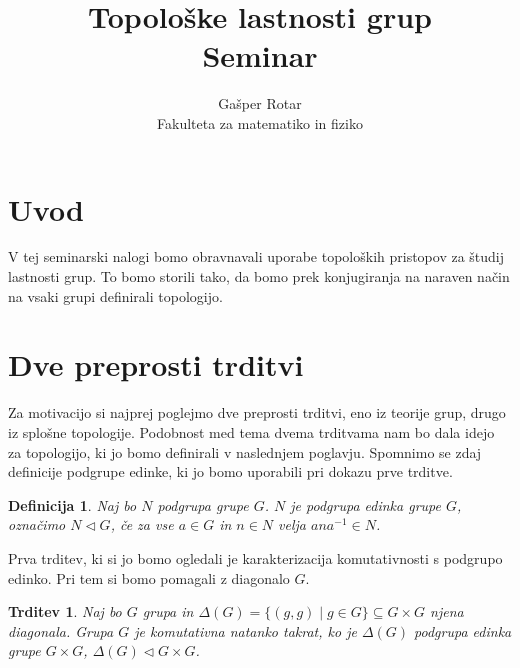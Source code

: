 \documentclass[a4paper,12pt]{article}
\title{Topološke lastnosti grup \\ 
\Large Seminar}
\author{Gašper Rotar \\
Fakulteta za matematiko in fiziko}
\newtheorem{trditev}{Trditev}
\newtheorem{definicija}{Definicija}
\begin{document}
\maketitle

\section{Uvod}

V tej seminarski nalogi bomo obravnavali uporabe topoloških pristopov za študij lastnosti grup.
To bomo storili tako, da bomo prek konjugiranja na naraven način na vsaki grupi definirali topologijo.



\section{Dve preprosti trditvi}

Za motivacijo si najprej poglejmo dve preprosti trditvi, eno iz teorije grup, drugo iz splošne topologije.
Podobnost med tema dvema trditvama nam bo dala idejo za topologijo, ki jo bomo definirali v naslednjem poglavju.
Spomnimo se zdaj definicije podgrupe edinke, ki jo bomo uporabili pri dokazu prve trditve.

\begin{definicija}
    Naj bo $N$ podgrupa grupe $G$. $N$ je podgrupa \emph{edinka} grupe $G$, označimo $N \triangleleft G$, če za vse $a \in G$ in $n \in N$ velja $ana^{-1} \in N$.
\end{definicija}


Prva trditev, ki si jo bomo ogledali je karakterizacija komutativnosti s podgrupo edinko. Pri tem si bomo pomagali z diagonalo $G$.

\begin{trditev}
    Naj bo $G$ grupa in $\Delta(G) = \{(g,g) \mid g \in G \} \subseteq G \times G$ njena diagonala.
    Grupa $G$ je komutativna natanko takrat, ko je $\Delta(G)$ podgrupa edinka grupe $G \times G$, $\Delta(G) \triangleleft G \times G$.
\end{trditev}
\end{document}
